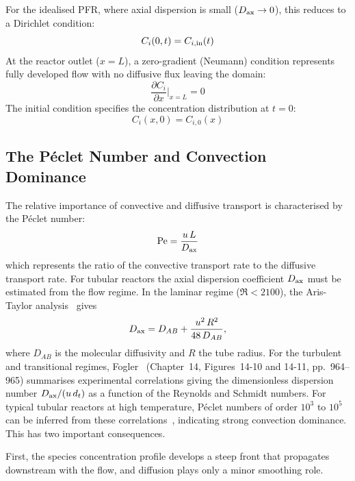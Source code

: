 For the idealised PFR, where axial dispersion is small (\(D_{\mathrm{ax}} \to 0\)), this reduces to a Dirichlet condition:
%
\begin{equation}
  C_i(0, t) = C_{i,\mathrm{in}}(t)
  \label{eq:dirichlet_inlet}
\end{equation}
%
At the reactor outlet (\(x = L\)), a zero-gradient (Neumann) condition represents fully developed flow with no diffusive flux leaving the domain:
%
\begin{equation}
  \frac{\partial C_i}{\partial x}\bigg|_{x=L} = 0
  \label{eq:neumann_outlet}
\end{equation}
%
The initial condition specifies the concentration distribution at \(t = 0\):
%
\begin{equation}
  C_i(x, 0) = C_{i,0}(x)
  \label{eq:initial_condition}
\end{equation}
%
\subsection{The P\'eclet Number and Convection Dominance}\label{ssec:peclet}

The relative importance of convective and diffusive transport is characterised by the P\'eclet number:
%
\begin{equation}
  \mathrm{Pe} = \frac{u\,L}{D_{\mathrm{ax}}}
  \label{eq:peclet}
\end{equation}
%
which represents the ratio of the convective transport rate to the diffusive transport rate. For tubular reactors the axial dispersion coefficient \(D_{\mathrm{ax}}\) must be estimated from the flow regime. In the laminar regime (\(\Re < 2100\)), the Aris-Taylor analysis~\cite{Taylor1953, Aris1956} gives
%
\begin{equation}
  D_{\mathrm{ax}} = D_{AB} + \frac{u^2\,R^2}{48\,D_{AB}},
  \label{eq:aris_taylor}
\end{equation}
%
where \(D_{AB}\) is the molecular diffusivity and \(R\) the tube radius. For the turbulent and transitional regimes, Fogler~\cite{Fogler2006} (Chapter~14, Figures~14-10 and 14-11, pp.~964--965) summarises experimental correlations giving the dimensionless dispersion number \(D_{\mathrm{ax}}/(u\,d_t)\) as a function of the Reynolds and Schmidt numbers. For typical tubular reactors at high temperature, P\'eclet numbers of order \(10^3\) to \(10^5\) can be inferred from these correlations~\cite{Fogler2006, Levenspiel1999, Froment2011}, indicating strong convection dominance. This has two important consequences.

First, the species concentration profile develops a steep front that propagates downstream with the flow, and diffusion plays only a minor smoothing role.

